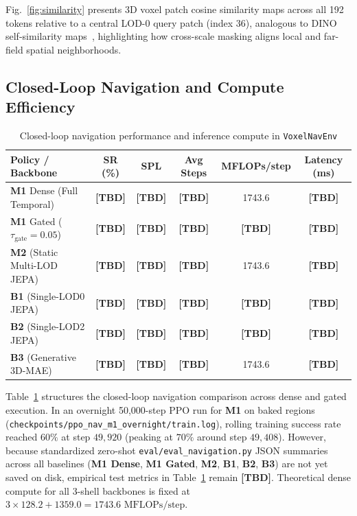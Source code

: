 \documentclass[runningheads]{llncs}
\begin{document}
Fig.~\ref{fig:similarity} presents 3D voxel patch cosine similarity maps across all 192 tokens relative to a central LOD-0 query patch (index 36), analogous to DINO self-similarity maps~\cite{caron2021dino}, highlighting how cross-scale masking aligns local and far-field spatial neighborhoods.

\subsection{Closed-Loop Navigation and Compute Efficiency}

\begin{table}[t]
\centering
\caption{Closed-loop navigation performance and inference compute in \texttt{VoxelNavEnv}}
\label{tab:navigation}
\begin{tabular}{l c c c c c}
\toprule
\textbf{Policy / Backbone} & \textbf{SR (\%)} & \textbf{SPL} & \textbf{Avg Steps} & \textbf{MFLOPs/step} & \textbf{Latency (ms)} \\
\midrule
\textbf{M1} Dense (Full Temporal)         & \textbf{[TBD]} & \textbf{[TBD]} & \textbf{[TBD]} & 1743.6 & \textbf{[TBD]} \\
\textbf{M1} Gated ($\tau_{\text{gate}}=0.05$) & \textbf{[TBD]} & \textbf{[TBD]} & \textbf{[TBD]} & \textbf{[TBD]} & \textbf{[TBD]} \\
\textbf{M2} (Static Multi-LOD JEPA)       & \textbf{[TBD]} & \textbf{[TBD]} & \textbf{[TBD]} & 1743.6 & \textbf{[TBD]} \\
\textbf{B1} (Single-LOD0 JEPA)            & \textbf{[TBD]} & \textbf{[TBD]} & \textbf{[TBD]} & \textbf{[TBD]} & \textbf{[TBD]} \\
\textbf{B2} (Single-LOD2 JEPA)            & \textbf{[TBD]} & \textbf{[TBD]} & \textbf{[TBD]} & \textbf{[TBD]} & \textbf{[TBD]} \\
\textbf{B3} (Generative 3D-MAE)           & \textbf{[TBD]} & \textbf{[TBD]} & \textbf{[TBD]} & 1743.6 & \textbf{[TBD]} \\
\bottomrule
\end{tabular}
\end{table}

Table~\ref{tab:navigation} structures the closed-loop navigation comparison across dense and gated execution. In an overnight 50{,}000-step PPO run for \textbf{M1} on baked regions (\texttt{checkpoints/ppo\_nav\_m1\_overnight/train.log}), rolling training success rate reached $60\%$ at step $49{,}920$ (peaking at $70\%$ around step $49{,}408$). However, because standardized zero-shot \texttt{eval/eval\_navigation.py} JSON summaries across all baselines (\textbf{M1 Dense}, \textbf{M1 Gated}, \textbf{M2}, \textbf{B1}, \textbf{B2}, \textbf{B3}) are not yet saved on disk, empirical test metrics in Table~\ref{tab:navigation} remain \textbf{[TBD]}. Theoretical dense compute for all 3-shell backbones is fixed at $3 \times 128.2 + 1359.0 = 1743.6\text{ MFLOPs/step}$.
\end{document}
